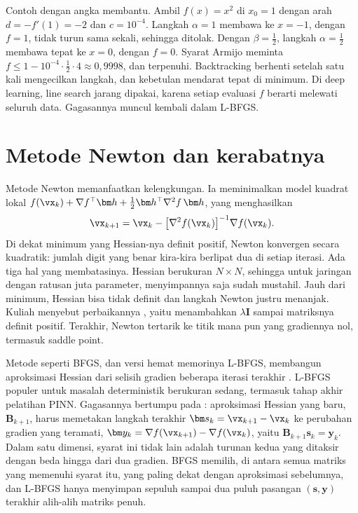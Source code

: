 Contoh dengan angka membantu. Ambil $f(x)=x^2$ di $x_0=1$ dengan arah $d=-f'(1)=-2$ dan $c=10^{-4}$. Langkah $\alpha=1$
membawa ke $x=-1$, dengan $f=1$, tidak turun sama sekali, sehingga ditolak. Dengan $\beta=\tfrac12$, langkah
$\alpha=\tfrac12$ membawa tepat ke $x=0$, dengan $f=0$. Syarat Armijo meminta $f\le1-10^{-4}\cdot\tfrac12\cdot4\approx0{,}9998$,
dan terpenuhi. Backtracking berhenti setelah satu kali mengecilkan langkah, dan kebetulan mendarat tepat di minimum. Di deep learning, line search
jarang dipakai, karena setiap evaluasi $f$ berarti melewati seluruh data. Gagasannya muncul
kembali dalam L-BFGS.

\section{Metode Newton dan kerabatnya}

Metode Newton memanfaatkan kelengkungan. Ia meminimalkan model kuadrat lokal
$f(\vx_k)+\nabla f^\top\bm h+\tfrac12\bm h^\top\nabla^2f\,\bm h$, yang menghasilkan
\begin{equation}
\vx_{k+1}=\vx_k-\big[\nabla^2 f(\vx_k)\big]^{-1}\nabla f(\vx_k).
\end{equation}
Di dekat minimum yang Hessian-nya definit positif, Newton konvergen secara kuadratik: jumlah
digit yang benar kira-kira berlipat dua di setiap iterasi. Ada tiga hal yang membatasinya.
Hessian berukuran $N\times N$, sehingga untuk jaringan dengan ratusan juta parameter,
menyimpannya saja sudah mustahil. Jauh dari minimum, Hessian bisa tidak definit dan langkah
Newton justru menanjak. Kuliah menyebut perbaikannya , yaitu
menambahkan $\lambda\bm I$ sampai matriksnya definit positif. Terakhir, Newton tertarik ke titik
mana pun yang gradiennya nol, termasuk saddle point.

Metode  seperti BFGS, dan versi hemat memorinya L-BFGS, membangun
aproksimasi Hessian dari selisih gradien beberapa iterasi terakhir \citep{nocedal2006}. L-BFGS
populer untuk masalah deterministik berukuran sedang, termasuk tahap akhir pelatihan PINN. Gagasannya bertumpu
pada : aproksimasi Hessian yang baru, $\bm B_{k+1}$, harus memetakan langkah terakhir
$\bm s_k=\vx_{k+1}-\vx_k$ ke perubahan gradien yang teramati, $\bm y_k=\nabla f(\vx_{k+1})-\nabla f(\vx_k)$, yaitu
$\bm B_{k+1}\bm s_k=\bm y_k$. Dalam satu dimensi, syarat ini tidak lain adalah turunan kedua yang ditaksir dengan beda
hingga dari dua gradien. BFGS memilih, di antara semua matriks yang memenuhi syarat itu, yang paling dekat dengan
aproksimasi sebelumnya, dan L-BFGS hanya menyimpan sepuluh sampai dua puluh pasangan $(\bm s,\bm y)$ terakhir alih-alih
matriks penuh.

